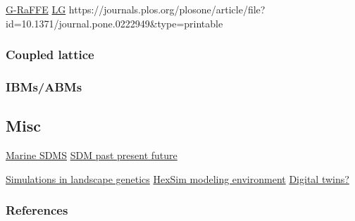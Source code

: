 \documentclass[
  12pt,
  a4paperpaper,
]{article}
\begin{document}
\href{https://doi.org/10.1371/journal.pone.0064968}{G-RaFFE}
\href{https://doi.org/10.1002/ece3.2145}{LG}
https://journals.plos.org/plosone/article/file?id=10.1371/journal.pone.0222949\&type=printable

\subsubsection{Coupled lattice}\label{coupled-lattice}

\subsubsection{IBMs/ABMs}\label{ibmsabms}

\subsection{Misc}\label{misc}

\href{https://doi.org/10.1016/j.ecolmodel.2019.108837}{Marine SDMS}
\href{https://doi.org/10.1111/jbi.14617}{SDM past present future}

\href{https://doi.org/10.1111/j.1365-294X.2010.04678.x}{Simulations in
landscape genetics}
\href{https://doi.org/10.1007/s10980-017-0605-9}{HexSim modeling
environment} \href{https://doi.org/10.1016/j.tree.2023.04.010}{Digital
twins?}

\newpage{}

\subsubsection{References}\label{references}
\end{document}
